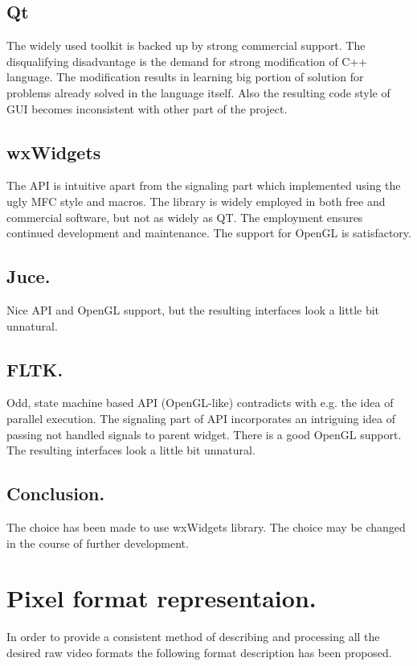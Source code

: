 \subsection{Qt}

The widely used toolkit is backed up by strong commercial support. The disqualifying disadvantage is the demand for strong modification of C++ language. The modification results in learning big portion of solution for problems already solved in the language itself. Also the resulting code style of GUI becomes inconsistent with other part of the project.

\subsection{wxWidgets}

The API is intuitive apart from the signaling part which implemented using the ugly MFC style and macros. The library is widely employed in both free and commercial software, but not as widely as QT. The employment ensures continued development and maintenance. The support for OpenGL is satisfactory.

\subsection{Juce.}
Nice API and OpenGL support, but the resulting interfaces look a little bit unnatural.

\subsection{FLTK.}
Odd, state machine based API (OpenGL-like) contradicts with e.g. the idea of parallel execution. The signaling part of API incorporates an intriguing idea of passing not handled signals to parent widget. There is a good OpenGL support. The resulting interfaces look a little bit unnatural.

\subsection{Conclusion.}
The choice has been made to use wxWidgets library. The choice may be changed in the course of further development.

\section{Pixel format representaion.}

In order to provide a consistent method of describing and processing all the desired raw video formats the following format description has been proposed.

